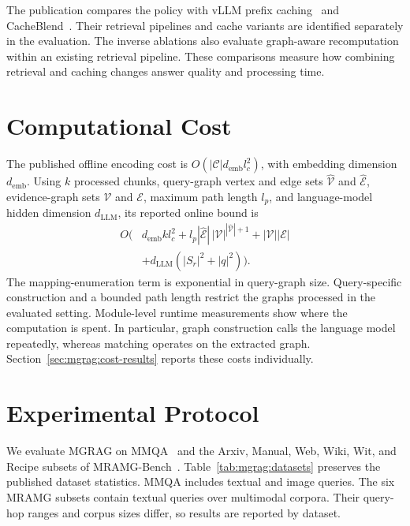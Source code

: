 The publication compares the policy with vLLM prefix caching~\cite{mgrag-kwon2023efficient} and CacheBlend~\cite{mgrag-yao2025cacheblend}. Their retrieval pipelines and cache variants are identified separately in the evaluation. The inverse ablations also evaluate graph-aware recomputation within an existing retrieval pipeline. These comparisons measure how combining retrieval and caching changes answer quality and processing time.

\section{Computational Cost}
\label{sec:mgrag:complexity}

The published offline encoding cost is $O(|\mathcal C|d_{\mathrm{emb}}l_c^2)$, with embedding dimension $d_{\mathrm{emb}}$. Using $k$ processed chunks, query-graph vertex and edge sets $\widehat{\mathcal V}$ and $\widehat{\mathcal E}$, evidence-graph sets $\mathcal V$ and $\mathcal E$, maximum path length $l_p$, and language-model hidden dimension $d_{\mathrm{LLM}}$, its reported online bound is
\begin{equation}
\begin{split}
 O\bigl(&d_{\mathrm{emb}}kl_c^2
 +l_p|\widehat{\mathcal E}|\,|\mathcal V|^{|\widehat{\mathcal V}|+1}
 +|\mathcal V||\mathcal E|\\
 &+d_{\mathrm{LLM}}(|S_r|^2+|q|^2)\bigr).
\end{split}
\label{eq:mgrag:complexity}
\end{equation}
The mapping-enumeration term is exponential in query-graph size. Query-specific construction and a bounded path length restrict the graphs processed in the evaluated setting. Module-level runtime measurements show where the computation is spent. In particular, graph construction calls the language model repeatedly, whereas matching operates on the extracted graph. Section~\ref{sec:mgrag:cost-results} reports these costs individually.

\section{Experimental Protocol}
\label{sec:mgrag:protocol}

We evaluate MGRAG on MMQA~\cite{mgrag-talmor2021multimodalqa} and the Arxiv, Manual, Web, Wiki, Wit, and Recipe subsets of MRAMG-Bench~\cite{mgrag-yu2025mramg}. Table~\ref{tab:mgrag:datasets} preserves the published dataset statistics. MMQA includes textual and image queries. The six MRAMG subsets contain textual queries over multimodal corpora. Their query-hop ranges and corpus sizes differ, so results are reported by dataset.

